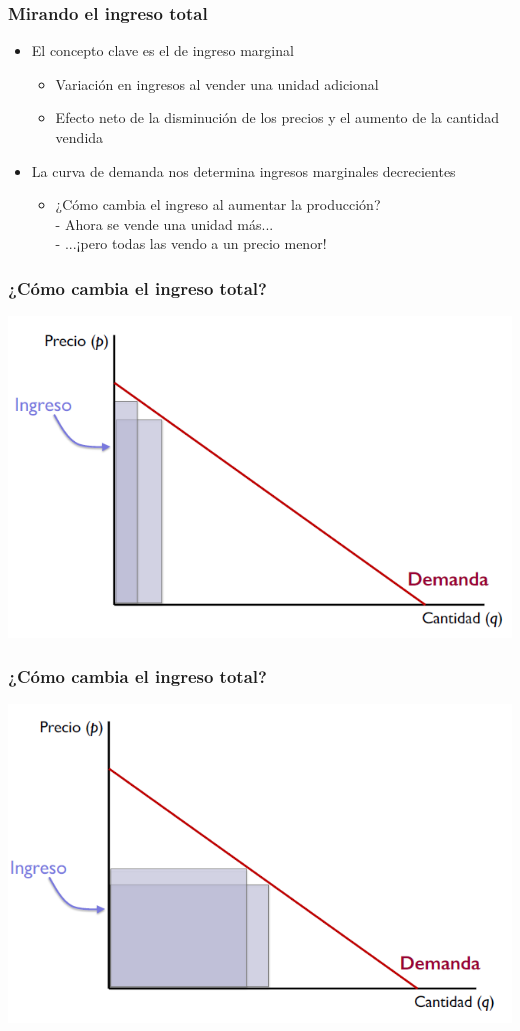 \documentclass{beamer}
\begin{document}
\begin{frame}
\frametitle{Mirando el ingreso total}
\begin{itemize}
    \item El concepto clave es el de ingreso marginal
    \begin{itemize}
        \item Variación en ingresos al vender una unidad adicional
        \item Efecto neto de la disminución de los precios y el aumento de la cantidad vendida
    \end{itemize}
    \item La curva de demanda nos determina ingresos marginales decrecientes
    \begin{itemize}
        \item ¿Cómo cambia el ingreso al aumentar la producción? \\
        - Ahora se vende una unidad más... \\
        - ...¡pero todas las vendo a un precio menor!
    \end{itemize}
\end{itemize}
\end{frame}

\begin{frame}
\frametitle{ ¿Cómo cambia el ingreso total?}
\includegraphics[scale=0.6]{Figures/Tema_06.30_ingresototal.png}
\end{frame}

\begin{frame}
\frametitle{ ¿Cómo cambia el ingreso total?}
\includegraphics[scale=0.6]{Figures/Tema_06.31_ingresototal2.png}
\end{frame}
\end{document}

